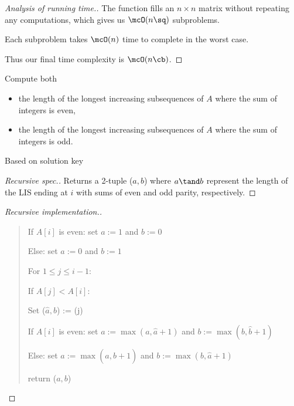 \documentclass{article}
\begin{document}
\begin{proof}[Analysis of running time.]
  The function  fills an $ n\times n $ matrix without repeating any computations, which gives us $ \mcO(n\sq) $ subproblems.

  Each subproblem takes $ \mcO(n) $ time to complete in the worst case.

  Thus our final time complexity is $ \mcO(n\cb) $.
\end{proof}
\pagebreak

\setcounter{subexercise}{3}
\begin{subexercise}
Compute both \begin{itemize}
\item the length of the longest increasing subsequences of $ A $ where the sum of integers is even,
\item the length of the longest increasing subsequences of $ A $ where the sum of integers is odd.
\end{itemize}
\end{subexercise}

\begin{note}
  Based on solution key
\end{note}

\begin{proof}[Recursive spec.]
Returns a 2-tuple ($ a,b $) where $ a\tand b $ represent the length of the LIS ending at $ i $ with sums of even and odd parity, respectively.
\end{proof}

\begin{proof}[Recursive implementation.]\
  \begin{quote}
  \begin{steps}
    \item If $ A[i] $ is even: set $ a := 1 $ and $ b := 0 $
    \item Else: set $ a := 0 $ and $ b := 1 $
    \item For $ 1 \leq j \leq i-1 $: \begin{steps}
      \item If $ A[j] < A[i] $: \begin{steps}
        \item Set ($ \hat a, \hat b $) := (j)
        \item If $ A[i] $ is even: set $ a := \max(a,\hat a + 1) $ and $ b := \max(b,\hat b+1) $
        \item Else: set $ a := \max(a,\hat b + 1) $ and $ b := \max(b,\hat a + 1) $
      \end{steps}
    \end{steps}
    \item return ($ a,b $)
  \end{steps}
  \end{quote}
\end{proof}
\end{document}
